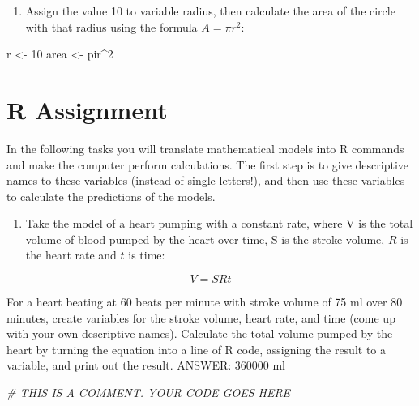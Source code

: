 \documentclass[
]{book}
\newenvironment{Shaded}{\begin{snugshade}}{\end{snugshade}}
\newcommand{\CommentTok}[1]{\textcolor[rgb]{0.56,0.35,0.01}{\textit{#1}}}
\newcommand{\DecValTok}[1]{\textcolor[rgb]{0.00,0.00,0.81}{#1}}
\newcommand{\NormalTok}[1]{#1}
\newcommand{\OperatorTok}[1]{\textcolor[rgb]{0.81,0.36,0.00}{\textbf{#1}}}
\newcommand{\StringTok}[1]{\textcolor[rgb]{0.31,0.60,0.02}{#1}}
\providecommand{\tightlist}{%
  \setlength{\itemsep}{0pt}\setlength{\parskip}{0pt}}
\theoremstyle{definition}
\theoremstyle{definition}
\theoremstyle{definition}
\theoremstyle{remark}
\begin{document}
\begin{enumerate}
\def\labelenumi{\arabic{enumi}.}
\setcounter{enumi}{9}
\tightlist
\item
  Assign the value 10 to variable radius, then calculate the area of the circle with that radius using the formula \(A = \pi r^2\):
\end{enumerate}

\begin{Shaded}
\begin{Highlighting}[]
\NormalTok{r \textless{}{-}}\StringTok{ }\DecValTok{10}
\NormalTok{area \textless{}{-}}\StringTok{ }\NormalTok{pir}\OperatorTok{\^{}}\DecValTok{2} 
\end{Highlighting}
\end{Shaded}

\hypertarget{r-assignment}{%
\section{R Assignment}\label{r-assignment}}

In the following tasks you will translate mathematical models into R commands and make the computer perform calculations. The first step is to give descriptive names to these variables (instead of single letters!), and then use these variables to calculate the predictions of the models.

\begin{enumerate}
\def\labelenumi{\arabic{enumi}.}
\tightlist
\item
  Take the model of a heart pumping with a constant rate, where V is the total volume of blood pumped by the heart over time, S is the stroke volume, \(R\) is the heart rate and \(t\) is time:
\end{enumerate}

\[ 
V = SRt
\]

For a heart beating at 60 beats per minute with stroke volume of 75 ml over 80 minutes, create variables for the stroke volume, heart rate, and time (come up with your own descriptive names). Calculate the total volume pumped by the heart by turning the equation into a line of R code, assigning the result to a variable, and print out the result. ANSWER: 360000 ml

\begin{Shaded}
\begin{Highlighting}[]
\CommentTok{\# THIS IS A COMMENT. YOUR CODE GOES HERE }
\end{Highlighting}
\end{Shaded}
\end{document}
